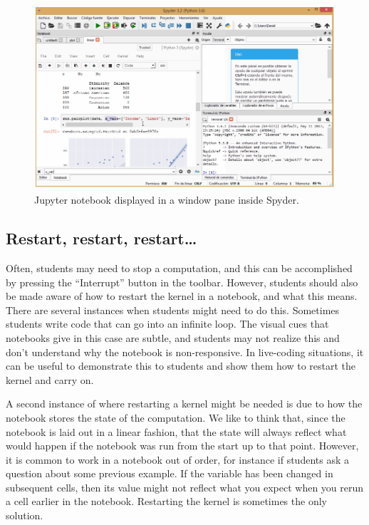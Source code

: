 \documentclass[]{book}
\begin{document}
\begin{figure}
\centering
\includegraphics{images/chapter54.png}
\caption{Jupyter notebook displayed in a window pane inside Spyder.}
\end{figure}

\subsection{Restart, restart,
restart\ldots{}}\label{restart-restart-restart}

Often, students may need to stop a computation, and this can be
accomplished by pressing the ``Interrupt'' button in the toolbar.
However, students should also be made aware of how to restart the kernel
in a notebook, and what this means. There are several instances when
students might need to do this. Sometimes students write code that can
go into an infinite loop. The visual cues that notebooks give in this
case are subtle, and students may not realize this and don't understand
why the notebook is non-responsive. In live-coding situations, it can be
useful to demonstrate this to students and show them how to restart the
kernel and carry on.

A second instance of where restarting a kernel might be needed is due to
how the notebook stores the state of the computation. We like to think
that, since the notebook is laid out in a linear fashion, that the state
will always reflect what would happen if the notebook was run from the
start up to that point. However, it is common to work in a notebook out
of order, for instance if students ask a question about some previous
example. If the variable has been changed in subsequent cells, then its
value might not reflect what you expect when you rerun a cell earlier in
the notebook. Restarting the kernel is sometimes the only solution.
\end{document}
